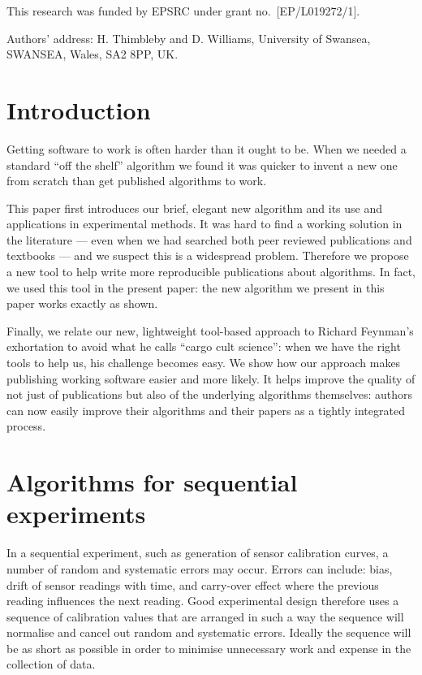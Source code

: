 \documentclass[prodmode,acmtecs]{acmsmall} %
\begin{document}
\begin{bottomstuff}
This research was funded by EPSRC under grant no.~[EP/L019272/1]. 

Authors' address: H. Thimbleby and D. Williams, University of Swansea, SWANSEA, Wales, SA2 8PP, UK\@.
\end{bottomstuff}
\maketitle

\section{Introduction}
Getting software to work is often harder than it ought to be. When we needed a standard ``off the shelf'' algorithm we found it was quicker to invent a new one from scratch than get published algorithms to work. 

This paper first introduces our brief, elegant new algorithm and its use and applications in experimental methods. It was hard to find a working solution in the literature --- even when we had searched both peer reviewed publications and textbooks --- and we suspect this is a widespread problem. Therefore we propose a new tool to help write more reproducible publications about algorithms. In fact, we used this tool in the present paper: the new algorithm we present in this paper works exactly as shown.

Finally, we relate our new, lightweight tool-based approach to Richard Feynman's exhortation to avoid what he calls ``cargo cult science'': when we have the right tools to help us, his challenge becomes easy. We show how our approach makes publishing working software easier and more likely. It helps improve the quality of not just of publications but also of the underlying algorithms themselves: authors can now easily improve their algorithms and their papers as a tightly integrated process.

\section{Algorithms for sequential experiments}
In a sequential experiment, such as generation of sensor calibration curves, a number of random and systematic errors may occur. Errors can include: bias, drift of sensor readings  with time, and carry-over effect where the previous reading influences the next reading. Good experimental design therefore uses a sequence of calibration values that are arranged in such a way the sequence will normalise and cancel out random and systematic errors. Ideally the sequence will be as short as possible in order to minimise unnecessary work and expense in the collection of data. 
\end{document}
